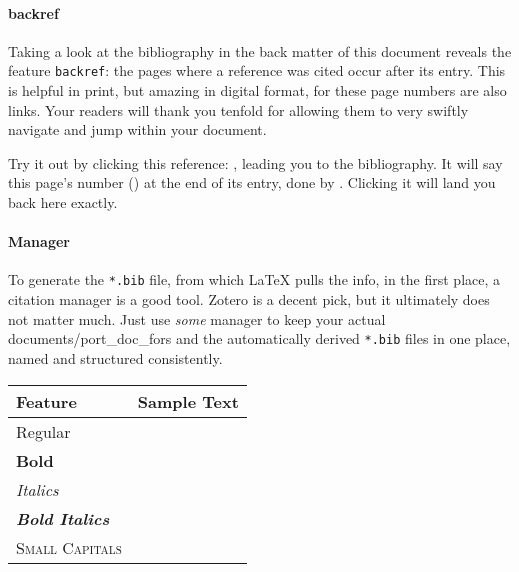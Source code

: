 \paragraph{backref}
Taking a look at the bibliography in the back matter of this document reveals the feature \verb|backref|: the pages where a reference was cited occur after its entry.
This is helpful in print, but amazing in digital format, for these page numbers are also links.
Your readers will thank you tenfold for allowing them to very swiftly navigate and jump within your document.

Try it out by clicking this reference: \autocite{braunling_flugzeugtriebwerke:_2015}, leading you to the bibliography.
\label{backref_example}
It will say this page's number () at the end of its entry, done by .
Clicking it will land you back here exactly.

\paragraph{Manager}
To generate the \texttt{*.bib} file, from which \LaTeX{} pulls the info, in the first place, a citation manager is a good tool.
Zotero is a decent pick, but it ultimately does not matter much.
Just use \emph{some} manager to keep your actual documents/\glspl{port_doc_for} and the automatically derived \texttt{*.bib} files in one place, named and structured consistently.
\begin{table}
	{%
		\sffamily
		\begin{tabular}{@{}ll@{}}%
		\toprule
			Feature & Sample Text\\
		\midrule
			Regular & \sampletext\\
			\textbf{Bold} & \textbf{\sampletext}\\
			\textit{Italics} & \textit{\sampletext}\\
			\textbf{\textit{Bold Italics}} & \textbf{\textit{\sampletext}}\\
			\textsc{Small Capitals} & \textsc{\sampletext}\\
		\bottomrule
		\end{tabular}
	}%
\end{table}
